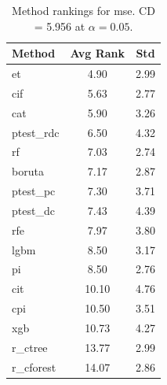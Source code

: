 \begin{table}[h]
\centering
\caption{Method rankings for mse. CD = 5.956 at $\alpha=0.05$.}
\label{tab:ranks_mse}
\begin{tabular}{lcc}
\toprule
Method & Avg Rank & Std \\
\midrule
et & 4.90 & 2.99 \\
cif & 5.63 & 2.77 \\
cat & 5.90 & 3.26 \\
ptest_rdc & 6.50 & 4.32 \\
rf & 7.03 & 2.74 \\
boruta & 7.17 & 2.87 \\
ptest_pc & 7.30 & 3.71 \\
ptest_dc & 7.43 & 4.39 \\
rfe & 7.97 & 3.80 \\
lgbm & 8.50 & 3.17 \\
pi & 8.50 & 2.76 \\
cit & 10.10 & 4.76 \\
cpi & 10.50 & 3.51 \\
xgb & 10.73 & 4.27 \\
r_ctree & 13.77 & 2.99 \\
r_cforest & 14.07 & 2.86 \\
\bottomrule
\end{tabular}
\end{table}